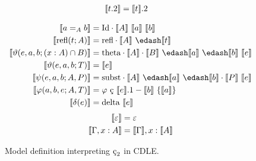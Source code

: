 \begin{figure}
\begin{minipage}{0.5\textwidth}
\begin{align*}
            \llbracket t.2 \rrbracket &= \llbracket t \rrbracket.2
        \end{align*}
    \end{minipage}
    \begin{align*}
        \sema{a =_A b} &= \cId \cdot \sema{A}\ \sema{a}\ \sema{b} \\
        \sema{\text{refl}(t; A)} &= \crefl \cdot \sema{A}\ \edash \sema{t} \\
        \sema{\vartheta(e, a, b; (x : A) \cap B)} &= \ctheta \cdot \sema{A} \cdot \sema{B}\ \edash \sema{a}\ \edash \sema{b}\ \sema{e} \\
        \sema{\vartheta(e, a, b; T)} &= \sema{e} \\
        \sema{\psi(e, a, b; A, P)} &= \csubst  \cdot \sema{A}\ \edash \sema{a}\ \edash \sema{b} \cdot \sema{P}\ \sema{e} \\
        \sema{\varphi(a, b, e; A, T)} &= \varphi\ \text{\c{c}}\ \sema{e}.1 - \sema{b}\ \{ \sema{a} \} \\
        \sema{\delta(e)} &= \cdelta\ \sema{e}
    \end{align*}
    \begin{align*}
        \llbracket \varepsilon \rrbracket &= \varepsilon \\
        \llbracket \Gamma, x : A \rrbracket &= \llbracket \Gamma \rrbracket, x : \llbracket A \rrbracket
    \end{align*}
    \caption{
        Model definition interpreting $\ced$ in CDLE.
    }
    \label{fig:4:model}
\end{figure}

